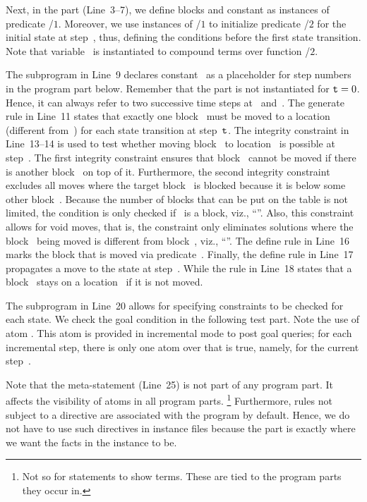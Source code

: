 Next, in the  part (Line~3--7),
we define blocks and constant 
as instances of predicate /$1$.
Moreover, we use instances of /$1$
to initialize predicate /$2$ for the initial state at step~, thus,
defining the conditions before the first state transition.
Note that variable~ is instantiated to compound terms
over function /$2$.

The  subprogram in Line~9 declares constant~ as a placeholder for step numbers in the program part below.
Remember that the  part is not instantiated for $\texttt{t}=0$.
Hence, it can always refer to two successive time steps at~ and~.
The generate rule in Line~11 states that exactly one block~ must be moved to a location~ (different from~) 
for each state transition at step~$\texttt{t}$.
The integrity constraint in Line~13--14 is used to test whether moving block~ to location~ is possible at step~.
The first integrity constraint ensures that block~ cannot be moved if there is another block~ on top of it.
Furthermore, the second integrity constraint excludes all moves where the target block~ is blocked because it is below some other block~.
Because the number of blocks that can be put on the table is not limited, the condition is only checked if~ is a block, viz., ``''.
Also, this constraint allows for void moves, that is,
the constraint only eliminates solutions where the block~ being moved is different from block~, viz., ``''.
The define rule in Line~16 marks the block that is moved via predicate~.
Finally, the define rule in Line~17 propagates a move to the state at step~.
While the rule in Line~18 states
that a block~ stays on a location~ if it is not moved.

The subprogram  in Line~20 
allows for specifying constraints to be checked for each state.
We check the goal condition in the following test part.
Note the use of atom .
This atom is provided in incremental mode to post goal queries;
for each incremental step, there is only one atom over  that is true,
namely,  for the current step~.

Note that the  meta-statement (Line~25)
is not part of any program part.
It affects the visibility of atoms in all program parts.%
\footnote{Not so for  statements to show terms.
These are tied to the program parts they occur in.}
Furthermore, rules not subject to a  directive are associated with the  program by default.
Hence, we do not have to use such directives in instance files
because the  part is exactly where we want the facts in the instance to be.

